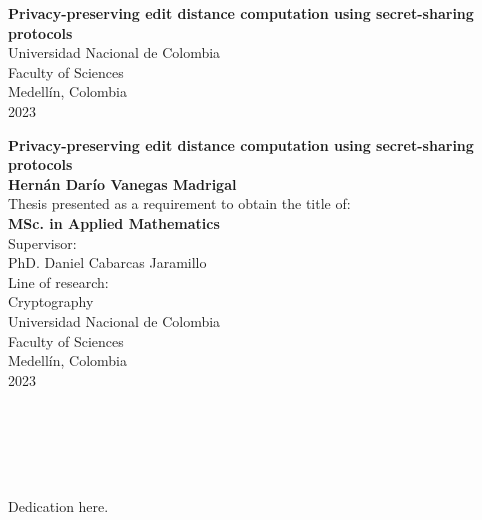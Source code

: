 \begin{center}
\begin{figure}
\centering%
%
\end{figure}
\thispagestyle{empty} \vspace*{2.0cm} \textbf{\huge
Privacy-preserving edit distance computation using secret-sharing protocols}\\[6.0cm]
\small Universidad Nacional de Colombia\\
Faculty of Sciences\\
Medellín, Colombia\\
2023\\
\end{center}

\newpage{\pagestyle{empty}\cleardoublepage}

\newpage
\begin{center}
\thispagestyle{empty} \vspace*{0cm} \textbf{\huge
Privacy-preserving edit distance computation using secret-sharing protocols}\\[3.0cm]
\Large\textbf{Hernán Darío Vanegas Madrigal}\\[3.0cm]
\small Thesis presented as a requirement to obtain the title of:\\
\textbf{MSc. in Applied Mathematics}\\[2.5cm]
Supervisor:\\
PhD. Daniel Cabarcas Jaramillo\\[2.0cm]
Line of research:\\
Cryptography\\[2.5cm]
Universidad Nacional de Colombia\\
Faculty of Sciences\\
Medellín, Colombia\\
2023\\
\end{center}

\newpage{\pagestyle{empty}\cleardoublepage}

\newpage
\thispagestyle{empty} \textbf{}\normalsize
\\\\\\%
\\[4.0cm]

\begin{flushright}
\begin{minipage}{8cm}
    \noindent
        \small
        Dedication here.
\end{minipage}
\end{flushright}

